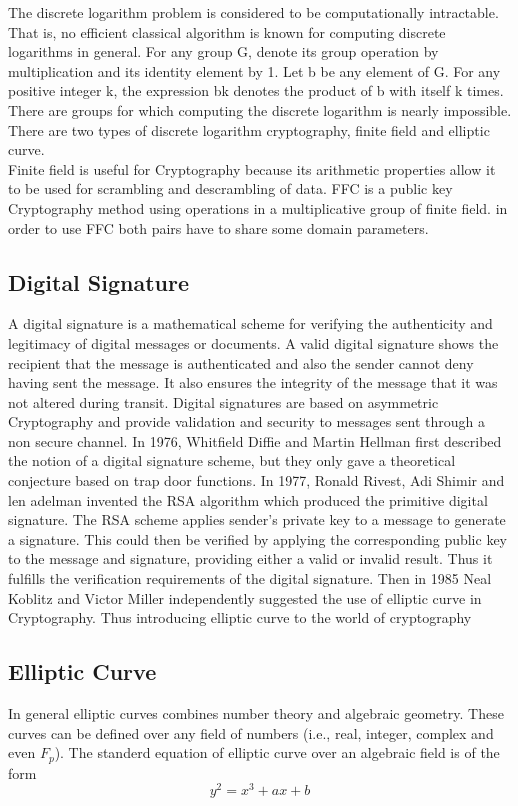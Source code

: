 \documentclass{report}
\begin{document}
The discrete logarithm problem is considered to be computationally intractable. That is, no efficient classical algorithm is known for computing discrete logarithms in general.
For any group G, denote its group operation by multiplication and its identity element by 1. Let b be any element of G. For any positive integer k, the expression bk denotes the product of b with itself k times. There are groups for which computing the discrete logarithm is nearly impossible.
There are two types of discrete logarithm cryptography, finite field and elliptic curve. \\
 Finite field is useful for Cryptography because its arithmetic properties allow it to be used for scrambling and descrambling of data. FFC is a public key Cryptography method using operations in a multiplicative group of finite field. in order to use FFC both pairs have to share some domain parameters. 

\subsection{Digital Signature}
 A digital signature is a mathematical scheme for verifying the authenticity and legitimacy of digital messages or documents.  A valid digital signature shows the recipient that the message is authenticated and also the sender cannot deny having sent the message.  It also ensures the integrity of the message that it was not altered during transit.  Digital signatures are based on asymmetric Cryptography and provide validation and security to messages sent through a non secure channel.  In 1976, Whitfield Diffie and Martin Hellman first described the notion of a digital signature scheme, but they only gave a theoretical conjecture based on trap door functions.  In 1977, Ronald Rivest, Adi Shimir and len adelman invented the RSA algorithm which produced the primitive digital signature. The RSA scheme applies sender's  private key to a message to generate a signature.  This could then be verified by applying the corresponding  public key to the message and signature,  providing either a valid  or invalid  result. Thus it fulfills the verification requirements of the digital signature. Then in 1985 Neal Koblitz and Victor Miller  independently suggested the use of elliptic curve in Cryptography. Thus introducing elliptic curve to the world of cryptography
\subsection{Elliptic Curve}
In general elliptic curves combines number theory and algebraic geometry. These curves can be defined over any field of numbers (i.e., real, integer, complex and even $F_p$).
 The standerd equation of elliptic curve over an algebraic field is of the form
$$ y^{2}=x^{3}+ax+b$$
  
\end{document}
